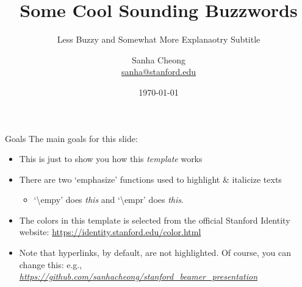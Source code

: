 \documentclass[pdf]{beamer}
\title[Buzz Words, maybe Clever Abbreviations]{Some Cool Sounding Buzzwords}
\subtitle{Less Buzzy and Somewhat More Explanaotry Subtitle}
\newcommand{\empy}[1]{{\color{darkorange}\emph{#1}}}
\newcommand{\empr}[1]{{\color{cardinalred}\emph{#1}}}
\theoremstyle{remark}
\theoremstyle{definition}
\begin{document}
\author[S. Cheong, Stanford]{
	\begin{tabular}{c} 
	\Large
	Sanha Cheong\\
    \footnotesize \href{mailto:sanha@stanford.edu}{sanha@stanford.edu}
\end{tabular}
\vspace{-4ex}}


\date{\today}

\begin{noheadline}
\begin{frame}\maketitle\end{frame}
\end{noheadline}



\begin{frame}{Goals}
The main goals for this slide:
\begin{itemize}
	\item This is just to show you how this \empy{template} works
	\item There are two `emphasize' functions used to highlight \& italicize texts
	\begin{itemize}
		\item `\textbackslash empy' does \empy{this} and `\textbackslash empr' does \empr{this}.
	\end{itemize}
	\item The colors in this template is selected from the official Stanford Identity website: \href{https://identity.stanford.edu/color.html}{https://identity.stanford.edu/color.html}
	\item Note that hyperlinks, by default, are not highlighted. Of course, you can change this: e.g., \empr{\href{https://github.com/sanhacheong/stanford_beamer_presentation}{https://github.com/sanhacheong/stanford\_beamer\_presentation}}
\end{itemize}
\end{frame}
\end{document}
